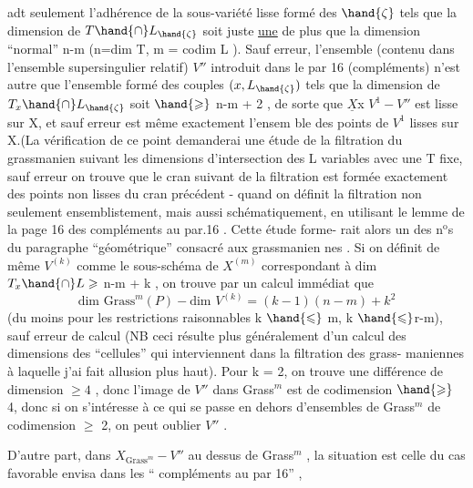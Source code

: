 
adt seulement l'adhérence de la sous-variété lisse formé des $\hand{\zeta}$ tels que
la dimension de $T\hand{\cap}L_{\hand{\zeta}}$ soit juste \uline{une} de plus que la dimension
``normal'' n-m (n=dim T, m = codim L ). Sauf erreur, l'ensemble
(contenu dans l'ensemble supersingulier relatif) $V''$ introduit dans le par
16 (compléments) n'est autre que l'ensemble formé des couples
$(x,L_{\hand{\zeta}})$ tels que la dimension de $T_x\hand{\cap}L_{\hand{\zeta}}$ soit $\hand{\geqslant}$ n-m + 2\hand{)} , de sorte que
$\underline{X}$x $V^1 - V''$ est  lisse sur X, et sauf erreur est même exactement l'ensem
ble des points de $V^1$ lisses sur X.(La vérification de ce point demanderai
une étude de la filtration du   grassmanien suivant les 
dimensions d'intersection des L variables avec une T fixe, sauf erreur on
trouve que le cran suivant de la filtration est formée exactement des
points non lisses du cran précédent - quand on définit la filtration
\placedmargin{$|$} non seulement ensemblistement, mais aussi schématiquement, en utilisant
\placedmargin{$|$} le lemme de la page 16 des compléments au par.16 \hand{\unsure{)}}. Cette étude forme-%
\placedmargin{$|$} rait alors un des n$^{\text{o}}$s du paragraphe ``géométrique'' consacré aux grassmanien
\placedmargin{$|$} nes \hand{)}. Si on définit de même  $V^{(k)}$ comme le sous-schéma de $X^{(m)}$
correspondant à dim $T_x\hand{\cap}L \geqslant$ n-m + k , on trouve par un calcul immédiat
que 
\[ \text{dim Grass}^m(P) - \text{dim } V^{(k)} = (k-1)(n-m) + k^2 \]
(du moins pour les restrictions raisonnables k $\hand{\leqslant}$ m, k $\hand{\leqslant}$r-m), sauf
erreur de calcul (NB ceci résulte plus généralement d'un calcul des
dimensions des ``cellules'' qui interviennent dans la filtration des grass-%
maniennes à laquelle j'ai fait allusion plus haut). Pour k = 2, on
trouve une différence de dimension $\geqslant 4$ , donc l'image de $V''$ dans Grass$^m$
est de codimension $\hand{\geqslant}$ 4, donc si on s'intéresse à ce qui se passe en dehors
d'ensembles de Grass$^m$ de codimension $\geqslant$ 2, on peut  oublier $V''$ .

D'autre part, dans $X_{\text{Grass}^m} - V''$ au dessus de Grass$^m$ , la situation
est celle du cas favorable envisa dans les `` compléments au par 16'' ,

